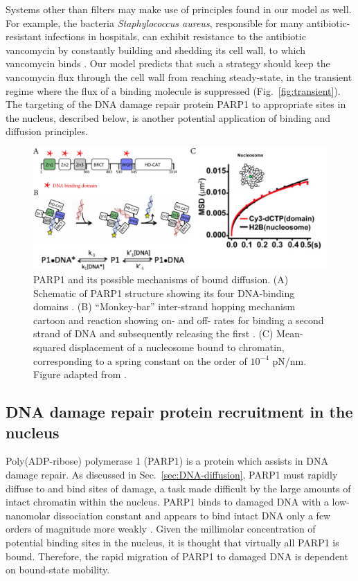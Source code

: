Systems other than filters may make use of principles found in our model as well.  For example, the bacteria \textit{Staphylococcus aureus}, responsible for many antibiotic-resistant infections in hospitals, can exhibit resistance to the antibiotic vancomycin by constantly building and shedding its cell wall, to which vancomycin binds \cite{mcguinness17}.  Our model predicts that such a strategy should keep the vancomycin flux through the cell wall from reaching steady-state, in the transient regime where the flux of a binding molecule is suppressed (Fig.~\ref{fig:transient}).  The targeting of the DNA damage repair protein PARP1 to appropriate sites in the nucleus, described below, is another potential application of binding and diffusion principles.

\begin{figure}
\centering
\includegraphics[width=0.8\linewidth]{figs/ch02/PARP1.pdf}
\caption[Possible bound-diffusion mechanisms of PARP1.]{PARP1 and its possible mechanisms of bound diffusion. (A) Schematic of PARP1 structure showing its four DNA-binding domains \cite{rudolph18}. (B) ``Monkey-bar'' inter-strand hopping mechanism cartoon and reaction showing on- and off- rates for binding a second strand of DNA and subsequently releasing the first \cite{rudolph18}.  (C) Mean-squared displacement of a nucleosome bound to chromatin, corresponding to a spring constant on the order of $10^{-4}$ pN/nm.  Figure adapted from \cite{nozaki17}.}
\label{fig:parp1}
\end{figure}

\subsection{DNA damage repair protein recruitment in the nucleus}
\label{sec:parp1}

Poly(ADP-ribose) polymerase 1 (PARP1) is a protein  which assists in DNA damage repair.  As discussed in Sec.~\ref{sec:DNA-diffusion}, PARP1 must rapidly diffuse to and bind sites of damage, a task made difficult by the large amounts of intact chromatin within the nucleus.  PARP1 binds to damaged DNA with a low-nanomolar dissociation constant and appears to bind intact DNA only a few orders of magnitude more weakly \cite{rudolph18,sukhanova16}.  Given the millimolar concentration of potential binding sites in the nucleus, it is thought that virtually all PARP1 is bound.  Therefore, the rapid migration of PARP1 to damaged DNA is dependent on bound-state mobility.

